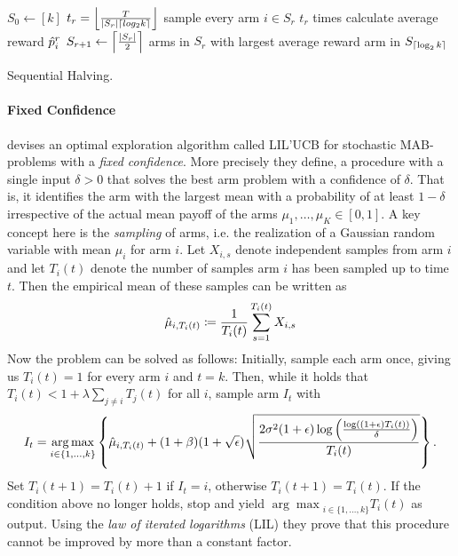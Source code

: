 \begin{algorithm}[htbp]
\begin{algorithmic}
    \State $S_0 \gets [k]$
    \State $t_r = \floor*{\frac{T}{\left|S_r\right| \ceil*{log_2 k}}}$
    \State sample every arm $i \in S_r$ $t_r$ times
    \State calculate average reward $\Hat{p}_i^r$
    \State $S_{r+1} \gets \ceil*{\frac{\left| S_r \right|}{2}}$ arms in $S_r$ with largest average reward
    \EndFor
    \State \Return arm in $S_{\ceil*{\log_2 k}}$
\EndFunction
\end{algorithmic}
\caption{Sequential Halving.}
\label{alg:sequential_halving}
\end{algorithm}

\paragraph{Fixed Confidence}
\cite{jamieson2014lil} devises an optimal exploration algorithm called LIL'UCB for stochastic MAB-problems with a \textit{fixed confidence}. More precisely they define, a procedure with a single input $\delta > 0$ that solves the best arm problem with a confidence of $\delta$. That is, it identifies the arm with the largest mean with a probability of at least $1-\delta$ irrespective of the actual mean payoff of the arms $\mu_1,\ldots,\mu_K \in [0,1]$. A key concept here is the \textit{sampling} of arms, i.e. the realization of a Gaussian random variable with mean $\mu_i$ for arm $i$. Let $X_{i,s}$ denote independent samples from arm $i$ and let $T_i(t)$ denote the number of samples arm $i$ has been sampled up to time $t$. Then the empirical mean of these samples can be written as
\begin{equation*}
    \Hat{\mu}_{i,T_i(t)} \coloneqq \frac{1}{T_i(t)}\sum_{s=1}^{T_i(t)} X_{i,s}
\end{equation*}
Now the problem can be solved as follows: Initially, sample each arm once, giving us $T_i(t) = 1$ for every arm $i$ and $t = k$. Then, while it holds that $T_i(t) < 1 + \lambda \sum_{j\neq i} T_j(t)$ for all $i$, sample arm $I_t$ with
\begin{equation*}
    I_t = \underset{i \in \{1,\ldots,k\}}{\arg \max} \left\{ \Hat{\mu}_{i,T_i(t)} + (1+\beta)(1+\sqrt{\epsilon}) \sqrt{\frac{2\sigma^2 (1+\epsilon) \log \left(\frac{\log((1+\epsilon)T_i(t))}{\delta}\right)}{T_i(t)}}\right\}\text{.}
\end{equation*}
Set $T_i(t+1) = T_i(t) + 1$ if $I_t = i$, otherwise $T_i(t+1) = T_i(t)$. If the condition above no longer holds, stop and yield ${\arg \max}_{i \in \{ 1,\ldots,k\}} T_i(t)$ as output. Using the \textit{law of iterated logarithms} (LIL) they prove that this procedure cannot be improved by more than a constant factor.  
